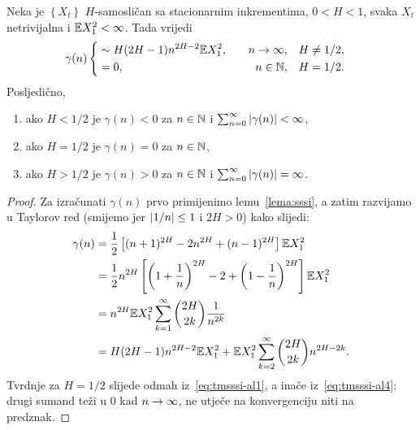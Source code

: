 \documentclass[main.tex]{subfiles}
\begin{document}
\begin{teorem}
	Neka je \( \left\{ X_t \right\} \) \( H \)-samosličan sa stacionarnim inkrementima, \( 0 < H < 1 \),
	svaka \( X_t \) netrivijalna i \( \mathbb{E} X_1^2 < \infty \). Tada vrijedi
	\begin{equation}
		\gamma(n)  \begin{cases}\begin{aligned}
				 & \sim H(2H-1)n^{2H-2}\mathbb{E} X_1^2, & \quad n \rightarrow \infty,    & \quad H\neq 1/2, \\
				 & =0,                           & \quad n \in \mathbb{N}, & \quad H=1/2.
			\end{aligned}\end{cases}
	\end{equation}
	Posljedično,
	\begin{enumerate}[label=(\roman*)]
		\item ako \( H < 1/2 \) je \( \gamma(n) < 0 \) za \( n \in \mathbb{N} \) i \( \sum_{n=0}^\infty \left| {\gamma(n)} \right| < \infty \),
		\item ako \( H=1/2 \) je \( \gamma(n)=0 \) za \( n \in \mathbb{N} \),
		\item ako \( H>1/2 \) je \( \gamma(n) > 0\) za \( n \in \mathbb{N} \) i  \( \sum_{n=0}^\infty \left| {\gamma(n)} \right| = \infty \).
	\end{enumerate}
\end{teorem}

\begin{proof}
	Za izračunati \( \gamma(n) \) prvo primijenimo lemu~\ref{lema:sssi}, a zatim
	razvijamo u Taylorov red (smijemo jer \( \left| {1/n} \right| \le 1 \) i \( 2H > 0 \)) kako slijedi:
	\begin{align}
		\gamma(n) & = \frac 12 \left[ (n+1)^{2H} - 2n^{2H} + (n-1)^{2H} \right] \mathbb{E} X_1^2                                          \label{eq:tmsssi-al1} \\
		          & = \frac 12 n^{2H} \left[ \left( 1+\frac 1n \right)^{2H} - 2 + \left( 1-\frac 1n \right)^{2H} \right] \mathbb{E} X_1^2                       \\
		          & = n^{2H} \mathbb{E} X_1^2 \sum_{k=1}^\infty \binom{2H}{2k} \frac 1{n^{2k}}                                                                  \\
		          & = H(2H-1)n^{2H-2}\mathbb{E} X_1^2 + \mathbb{E} X_1^2 \sum_{k=2}^\infty \binom{2H}{2k}n^{2H-2k}.\label{eq:tmsssi-al4}
	\end{align}
	Tvrdnje za \( H=1/2 \) slijede odmah iz~\eqref{eq:tmsssi-al1}, a inače iz~\eqref{eq:tmsssi-al4}: drugi sumand teži u \( 0 \) kad \( n \rightarrow \infty \), ne utječe na konvergenciju niti na
	predznak.

\end{proof}
\end{document}
